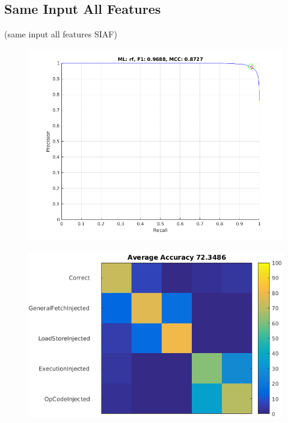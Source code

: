 \documentclass{sig-alternate}
\begin{document}
\subsection{Same Input All Features}
(same input all features SIAF)

\begin{figure}[t]
\begin{center}
   \includegraphics[width=0.95\linewidth]{./figures/siaf.png}
\end{center}
   \caption{}
\label{fig:siaf}
\end{figure}

\begin{figure}[t]
\begin{center}
   \includegraphics[width=0.95\linewidth]{./figures/siaf_multi.png}
\end{center}
   \caption{}
\label{fig:siaf-multi}
\end{figure}
\end{document}
